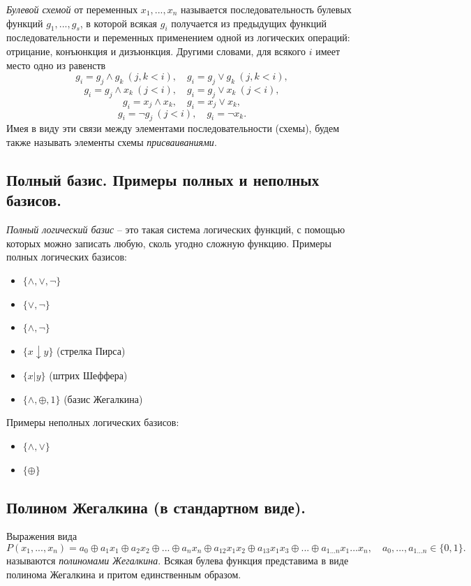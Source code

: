 \textit{Булевой схемой} от переменных $x_1, ..., x_n$ называется последовательность булевых функций $g_1,...,g_s$, в которой всякая $g_i$ получается из предыдущих функций последовательности и переменных применением одной из логических операций: отрицание, конъюнкция и дизъюнкция. Другими словами, для всякого $i$ имеет место одно из равенств
\[
g_i = g_j \wedge g_k \> (j, k < i),
\quad
g_i = g_j \vee g_k \> (j,k < i),
\]
\[
g_i = g_j \wedge x_k \> (j < i),
\quad
g_i = g_j \vee x_k \> (j < i),
\]
\[
g_i = x_j \wedge x_k,
\quad
g_i = x_j \vee x_k,
\]
\[
g_i = \neg g_j \> (j < i),
\quad
g_i = \neg x_k.
\]
Имея в виду эти связи между элементами последовательности (схемы), будем также называть элементы схемы \textit{присваиваниями}.
\newpage

\subsection{Полный базис. Примеры полных и неполных базисов.}
\textit{Полный логический базис} -- это такая система логических функций, с помощью которых можно записать любую, сколь угодно сложную функцию. 
\newline
Примеры полных логических базисов:
\begin{itemize}
    \item $\{\wedge, \vee, \neg\}$
    \item $\{\vee, \neg\}$
    \item $\{\wedge, \neg\}$
    \item $\{x \downarrow y\}$ (стрелка Пирса)
    \item $\{x | y\}$ (штрих Шеффера)
    \item $\{\wedge, \oplus, 1 \}$ (базис Жегалкина)
\end{itemize}
Примеры неполных логических базисов:
\begin{itemize}
    \item $\{\wedge, \vee\}$
    \item $\{\oplus \}$
\end{itemize}




\subsection{Полином Жегалкина (в стандартном виде).}
Выражения вида
\[
P(x_1,...,x_n) = a_0 \oplus a_1x_1 \oplus a_2x_2 \oplus ... \oplus a_nx_n \oplus a_{12}x_1x_2 \oplus a_{13}x_1x_3 \oplus ... \oplus a_{1...n}x_1...x_n,
\quad
a_0,...,a_{1...n} \in \{0,1\}.
\]
называются \textit{полиномами Жегалкина}.
\newline
\newline
Всякая булева функция представима в виде полинома Жегалкина и притом единственным образом.


